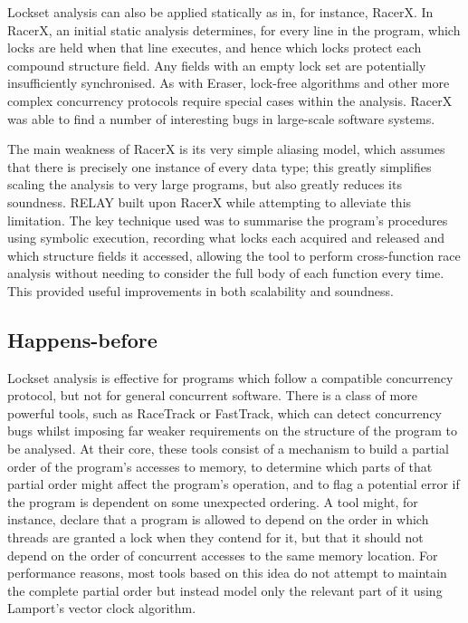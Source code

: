 Lockset analysis can also be applied statically as in, for instance,
RacerX\cite{Engler2003}.  In RacerX, an initial static analysis
determines, for every line in the program, which locks are held when
that line executes, and hence which locks protect each compound
structure field.  Any fields with an empty lock set are potentially
insufficiently synchronised.  As with Eraser, lock-free algorithms and
other more complex concurrency protocols require special cases within
the analysis.  RacerX was able to find a number of interesting bugs in
large-scale software systems.

The main weakness of RacerX is its very simple aliasing model, which
assumes that there is precisely one instance of every data type; this
greatly simplifies scaling the analysis to very large programs, but
also greatly reduces its soundness.  RELAY\cite{Voung2007} built upon
RacerX while attempting to alleviate this limitation.  The key
technique used was to summarise the program's
procedures\cite{Qadeer2004} using symbolic execution, recording what
locks each acquired and released and which structure fields it
accessed, allowing the tool to perform cross-function race analysis
without needing to consider the full body of each function every time.
This provided useful improvements in both scalability and soundness.


\subsection{Happens-before}

Lockset analysis is effective for programs which follow a compatible
concurrency protocol, but not for general concurrent software.  There
is a class of more powerful tools, such as RaceTrack\cite{Yu2005} or
FastTrack\cite{Flanagan2009}, which can detect concurrency bugs whilst
imposing far weaker requirements on the structure of the program to be
analysed.  At their core, these tools consist of a mechanism to build
a partial order of the program's accesses to memory, to determine
which parts of that partial order might affect the program's
operation, and to flag a potential error if the program is dependent
on some unexpected ordering.  A tool might, for instance, declare that
a program is allowed to depend on the order in which threads are
granted a lock when they contend for it, but that it should not depend
on the order of concurrent accesses to the same memory location.  For
performance reasons, most tools based on this idea do not attempt to
maintain the complete partial order but instead model only the
relevant part of it using Lamport's vector clock
algorithm\cite{Lamport1978}.


